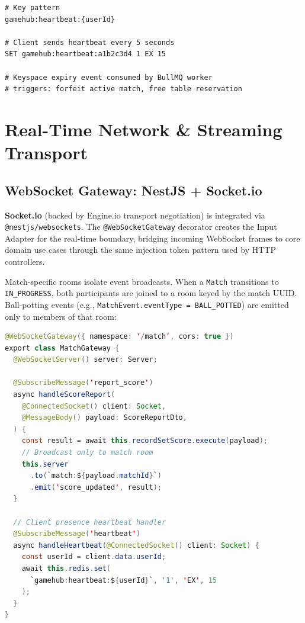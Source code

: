 \documentclass[11pt,a4paper]{report}
\begin{document}
\begin{lstlisting}[caption={Heartbeat key TTL namespace}]
# Key pattern
gamehub:heartbeat:{userId}

# Client sends heartbeat every 5 seconds
SET gamehub:heartbeat:a1b2c3d4 1 EX 15

# Keyspace expiry event consumed by BullMQ worker
# triggers: forfeit active match, free table reservation
\end{lstlisting}

\section{Real-Time Network \& Streaming Transport}

\subsection{WebSocket Gateway: NestJS + Socket.io}

\textbf{Socket.io} (backed by Engine.io transport negotiation) is integrated via \texttt{@nestjs/websockets}. The \texttt{@WebSocketGateway} decorator creates the Input Adapter for the real-time boundary, bridging incoming WebSocket frames to core domain use cases through the same injection token pattern used by HTTP controllers.

Match-specific rooms isolate event broadcasts. When a \texttt{Match} transitions to \texttt{IN\_PROGRESS}, both participants are joined to a room keyed by the match UUID. Ball-potting events (e.g., \texttt{MatchEvent.eventType = BALL\_POTTED}) are emitted only to members of that room:

\begin{lstlisting}[language=Java, caption={WebSocket gateway room and event pattern}]
@WebSocketGateway({ namespace: '/match', cors: true })
export class MatchGateway {
  @WebSocketServer() server: Server;

  @SubscribeMessage('report_score')
  async handleScoreReport(
    @ConnectedSocket() client: Socket,
    @MessageBody() payload: ScoreReportDto,
  ) {
    const result = await this.recordSetScore.execute(payload);
    // Broadcast only to match room
    this.server
      .to(`match:${payload.matchId}`)
      .emit('score_updated', result);
  }

  // Client presence heartbeat handler
  @SubscribeMessage('heartbeat')
  async handleHeartbeat(@ConnectedSocket() client: Socket) {
    const userId = client.data.userId;
    await this.redis.set(
      `gamehub:heartbeat:${userId}`, '1', 'EX', 15
    );
  }
}
\end{lstlisting}
\end{document}
